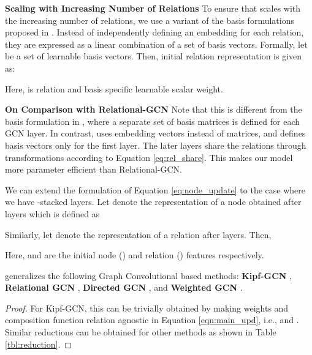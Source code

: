 \documentclass{article} \usepackage{iclr2020_conference,times}
\begin{document}
\textbf{Scaling with Increasing Number of Relations} To ensure that \method{} scales with the increasing number of relations, we use a variant of the basis formulations proposed in \citet{r_gcn}. Instead of independently defining an embedding for each relation, they are expressed as a linear combination of a set of basis vectors. Formally, let  be a set of learnable basis vectors. Then, initial relation representation is given as:

Here,  is relation and basis specific learnable scalar weight.  

\textbf{On Comparison with Relational-GCN} Note that this is different from the basis formulation in \cite{r_gcn}, where a separate set of basis matrices is defined for each GCN layer. In contrast, \method{} uses embedding vectors instead of matrices, and defines basis vectors only for the first layer. The later layers share the relations through transformations according to Equation \ref{eq:rel_share}. This makes our model more parameter efficient than Relational-GCN.



We can extend the formulation of Equation \ref{eq:node_update} to the case where we have -stacked \method{} layers. Let  denote the representation of a node  obtained after  layers which is defined as

Similarly, let  denote the representation of a relation  after  layers. Then,

Here,  and  are the initial node () and relation () features respectively. \\ 



\begin{proposition}
\label{prop:reduction}
\method{} generalizes the following Graph Convolutional based methods: \textbf{Kipf-GCN} \citep{Kipf2016}, \textbf{Relational GCN} \citep{r_gcn}, \textbf{Directed GCN} \citep{gcn_srl}, and \textbf{Weighted GCN} \citep{sacn_paper}. 
\end{proposition}
\begin{proof}
	For Kipf-GCN, this can be trivially obtained by making weights  and composition function  relation agnostic in Equation \ref{eqn:main_upd}, i.e.,  and . Similar reductions can be obtained for other methods as shown in Table \ref{tbl:reduction}.
\end{proof}
\end{document}
